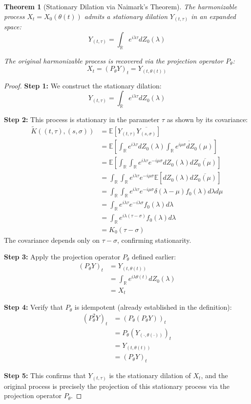 \documentclass{article}
\newtheorem{theorem}{Theorem}
\begin{document}
\begin{theorem}[Stationary Dilation via Naimark's Theorem]
The harmonizable process $X_t = X_0(\theta(t))$ admits a stationary dilation $Y_{(t,\tau)}$ in an expanded space:
$$Y_{(t,\tau)} = \int_{\mathbb{R}} e^{i\lambda\tau}dZ_0(\lambda)$$

The original harmonizable process is recovered via the projection operator $P_\theta$:
$$X_t = (P_\theta Y)_t = Y_{(t,\theta(t))}$$
\end{theorem}

\begin{proof}
\textbf{Step 1:} We construct the stationary dilation:
$$Y_{(t,\tau)} = \int_{\mathbb{R}} e^{i\lambda\tau}dZ_0(\lambda)$$

\textbf{Step 2:} This process is stationary in the parameter $\tau$ as shown by its covariance:
\begin{align*}
\tilde{K}((t,\tau),(s,\sigma)) &= \mathbb{E}[Y_{(t,\tau)}\overline{Y_{(s,\sigma)}}]\\
&= \mathbb{E}\left[\int_{\mathbb{R}} e^{i\lambda\tau}dZ_0(\lambda) \overline{\int_{\mathbb{R}} e^{i\mu\sigma}dZ_0(\mu)}\right]\\
&= \mathbb{E}\left[\int_{\mathbb{R}}\int_{\mathbb{R}} e^{i\lambda\tau}e^{-i\mu\sigma}dZ_0(\lambda)d\overline{Z_0(\mu)}\right]\\
&= \int_{\mathbb{R}}\int_{\mathbb{R}} e^{i\lambda\tau}e^{-i\mu\sigma}\mathbb{E}[dZ_0(\lambda)d\overline{Z_0(\mu)}]\\
&= \int_{\mathbb{R}}\int_{\mathbb{R}} e^{i\lambda\tau}e^{-i\mu\sigma}\delta(\lambda-\mu)f_0(\lambda)d\lambda d\mu\\
&= \int_{\mathbb{R}} e^{i\lambda\tau}e^{-i\lambda\sigma}f_0(\lambda)d\lambda\\
&= \int_{\mathbb{R}} e^{i\lambda(\tau-\sigma)}f_0(\lambda)d\lambda\\
&= K_0(\tau-\sigma)
\end{align*}
The covariance depends only on $\tau-\sigma$, confirming stationarity.

\textbf{Step 3:} Apply the projection operator $P_\theta$ defined earlier:
\begin{align*}
(P_\theta Y)_t &= Y_{(t,\theta(t))}\\
&= \int_{\mathbb{R}} e^{i\lambda\theta(t)}dZ_0(\lambda)\\
&= X_t
\end{align*}

\textbf{Step 4:} Verify that $P_\theta$ is idempotent (already established in the definition):
\begin{align*}
(P_\theta^2 Y)_t &= (P_\theta(P_\theta Y))_t\\
&= P_\theta(Y_{(\cdot,\theta(\cdot))})_t\\
&= Y_{(t,\theta(t))}\\
&= (P_\theta Y)_t
\end{align*}

\textbf{Step 5:} This confirms that $Y_{(t,\tau)}$ is the stationary dilation of $X_t$, and the original process is precisely the projection of this stationary process via the projection operator $P_\theta$.
\end{proof}
\end{document}

